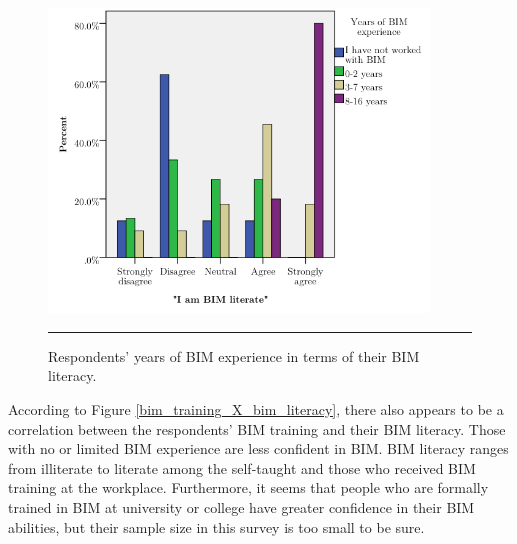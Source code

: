 \begin{figure}[htbp]
	\centering
	\includegraphics[width=0.9\textwidth]{figures/BIM_literacy_X_BIM_yrs.png}
	\rule{0.9\textwidth}{0.5pt} %
	\caption{Respondents' years of BIM experience in terms of their BIM literacy.}
	\label{bim_literacy_X_bim_yrs}
\end{figure}

According to Figure \ref{bim_training_X_bim_literacy},
there also appears to be a correlation between the respondents' BIM training and their BIM literacy.
Those with no or limited BIM experience are less confident in BIM.
BIM literacy ranges from illiterate to literate among the self-taught and those who received BIM training at the workplace.
Furthermore, it seems that people who are formally trained in BIM at university or college have greater confidence in their BIM abilities, but their sample size in this survey is too small to be sure.

